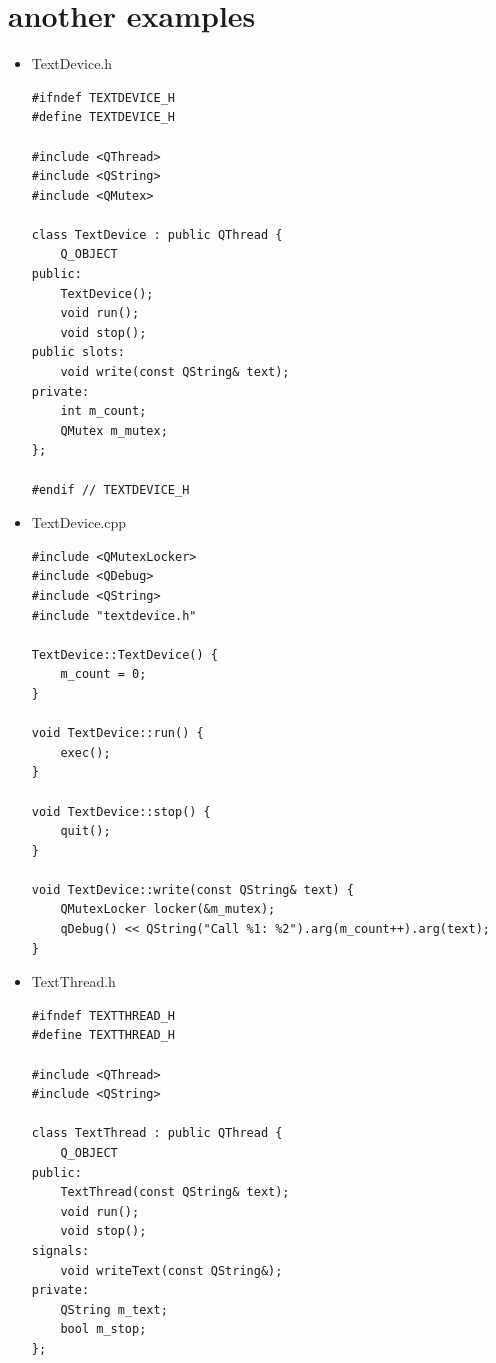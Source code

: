 \documentclass[9pt,b5paper]{article}
\begin{document}
\section{another examples}
\label{sec-8}
\begin{itemize}
\item TextDevice.h    
\lstset{language=java,label= ,caption= ,numbers=none}
\begin{lstlisting}
#ifndef TEXTDEVICE_H    
#define TEXTDEVICE_H    

#include <QThread>    
#include <QString>    
#include <QMutex>     

class TextDevice : public QThread {     
    Q_OBJECT     
public:     
    TextDevice();     
    void run();     
    void stop();     
public slots:     
    void write(const QString& text);     
private:     
    int m_count;     
    QMutex m_mutex;     
};    

#endif // TEXTDEVICE_H
\end{lstlisting}

\item TextDevice.cpp    
\lstset{language=java,label= ,caption= ,numbers=none}
\begin{lstlisting}
#include <QMutexLocker>    
#include <QDebug>    
#include <QString>    
#include "textdevice.h"     

TextDevice::TextDevice() {     
    m_count = 0;     
}     

void TextDevice::run() {     
    exec();     
}     

void TextDevice::stop() {     
    quit();     
}     

void TextDevice::write(const QString& text) {     
    QMutexLocker locker(&m_mutex);     
    qDebug() << QString("Call %1: %2").arg(m_count++).arg(text);     
}
\end{lstlisting}

\item TextThread.h    
\lstset{language=java,label= ,caption= ,numbers=none}
\begin{lstlisting}
#ifndef TEXTTHREAD_H    
#define TEXTTHREAD_H    

#include <QThread>    
#include <QString>     

class TextThread : public QThread {     
    Q_OBJECT     
public:     
    TextThread(const QString& text);     
    void run();     
    void stop();     
signals:     
    void writeText(const QString&);     
private:     
    QString m_text;     
    bool m_stop;     
};    


\end{lstlisting}
\end{itemize}
\end{document}
